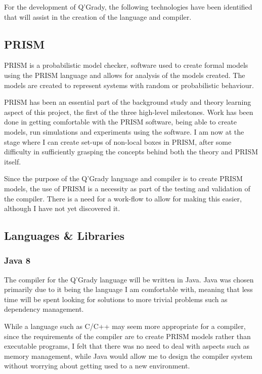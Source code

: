 \documentclass[11pt, a4paper]{article}
\begin{document}
For the development of Q'Grady, the following technologies have been identified
that will assist in the creation of the language and compiler.

\subsection{PRISM} %
\label{sub:prism}
PRISM is a probabilistic model checker, software used to create formal models
using the PRISM language and allows for analysis of the models created. The
models are created to represent systems with random or probabilistic behaviour.

PRISM has been an essential part of the background study and theory learning
aspect of this project, the first of the three high-level milestones. Work has
been done in getting comfortable with the PRISM software, being able to create
models, run simulations and experiments using the software. I am now at the
stage where I can create set-ups of non-local boxes in PRISM, after some
difficulty in sufficiently grasping the concepts behind both the theory and
PRISM itself.

Since the purpose of the Q'Grady language and compiler is to create PRISM
models, the use of PRISM is a necessity as part of the testing and validation of
the compiler. There is a need for a work-flow to allow for making this easier,
although I have not yet discovered it.
\subsection{Languages \& Libraries} %
\label{sub:languages_libraries}
\subsubsection{Java 8} %
\label{ssub:java_8}
The compiler for the Q'Grady language will be written in Java. Java was chosen
primarily due to it being the language I am comfortable with, meaning that less
time will be spent looking for solutions to more trivial problems such as
dependency management.

While a language such as C/C++ may seem more appropriate for a compiler, since
the requirements of the compiler are to create PRISM models rather than
executable programs, I felt that there was no need to deal with aspects such as
memory management, while Java would allow me to design the compiler system
without worrying about getting used to a new environment.
\end{document}
